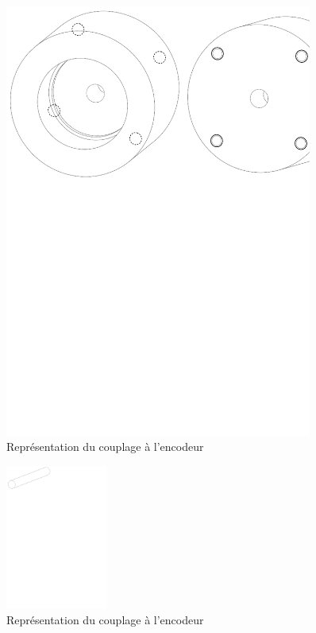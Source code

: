 \begin{figure}[H]
  \centering
  \includegraphics[width = 0.9\textwidth]{assets/figures/CouplageEncodeur.svg}
  \caption{Représentation du couplage à l'encodeur}
  \label{fig:CouplEnco}
\end{figure}

\begin{figure}[H]
  \centering
  \includegraphics[width = 0.3\textwidth]{assets/figures/CouplageEncodeur2.svg}
  \caption{Représentation du couplage à l'encodeur}
  \label{fig:CouplEnco2}
\end{figure}

